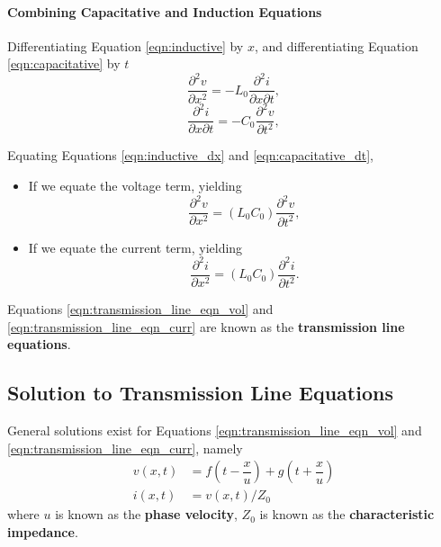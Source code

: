 \documentclass[12pt,a4paper]{article}
\begin{document}
\paragraph{Combining Capacitative and Induction Equations}
Differentiating Equation \ref{eqn:inductive} by $x$, and differentiating Equation \ref{eqn:capacitative} by $t$
\begin{equation}
\label{eqn:inductive_dx}
    \frac{\partial^2 v}{\partial x^2} = -L_0 \frac{\partial^2 i}{\partial x \partial t},
\end{equation}
\begin{equation}
\label{eqn:capacitative_dt}
    \frac{\partial^2 i}{\partial x \partial t} = -C_0 \frac{\partial^2 v}{\partial t^2},
\end{equation}

Equating Equations \ref{eqn:inductive_dx} and \ref{eqn:capacitative_dt}, 
\begin{itemize}
    \item If we equate the voltage term, yielding
    \begin{equation}
    \label{eqn:transmission_line_eqn_vol}
    \boxed{
        \frac{\partial^2 v}{\partial x^2} = (L_0 C_0) \frac{\partial^2 v}{\partial t^2}
    },
    \end{equation}

    \item If we equate the current term, yielding
    \begin{equation}
    \label{eqn:transmission_line_eqn_curr}
    \boxed{
        \frac{\partial^2 i}{\partial x^2} = (L_0 C_0) \frac{\partial^2 i}{\partial t^2}
    }.
    \end{equation}
\end{itemize}

Equations \ref{eqn:transmission_line_eqn_vol} and \ref{eqn:transmission_line_eqn_curr} are known as the \textbf{transmission line equations}.

\subsection{Solution to Transmission Line Equations}
General solutions exist for Equations \ref{eqn:transmission_line_eqn_vol} and \ref{eqn:transmission_line_eqn_curr}, namely
\begin{align}
    v(x, t) & = f\left(t-\dfrac{x}{u}\right) + g\left(t+\dfrac{x}{u}\right) \\[1em]
    i(x, t) & = v(x, t) / Z_0
\end{align}
where $u$ is known as the \textbf{phase velocity}, $Z_0$ is known as the \textbf{characteristic impedance}. 
\end{document}
